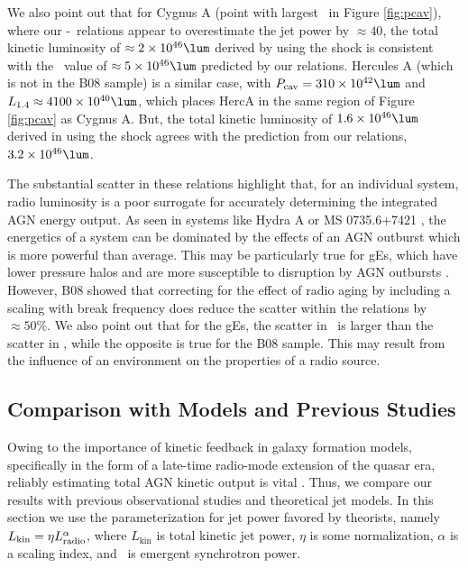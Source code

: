 \documentclass{emulateapj}
\begin{document}
We also point out that for Cygnus A (point with largest \prad\ in
Figure \ref{fig:pcav}), where our \pjet-\prad\ relations appear to
overestimate the jet power by $\approx 40$, the total kinetic
luminosity of $\approx 2\times10^{46} \lum$ derived by
\citep{2006ApJ...644L...9W} using the shock is consistent with the
\pjet\ value of $\approx 5\times10^{46} \lum$ predicted by our
relations. Hercules A (which is not in the B08 sample) is a similar
case, with $\pcav = 310\times10^{42} \lum$ and $\phigh \approx
4100\times10^{40} \lum$, which places HercA in the same region of
Figure \ref{fig:pcav} as Cygnus A. But, the total kinetic luminosity
of $1.6\times10^{46} \lum$ derived in \citet{herca} using the shock
agrees with the prediction from our relations, $3.2\times10^{46}
\lum$.

The substantial scatter in these relations highlight that, for an
individual system, radio luminosity is a poor surrogate for accurately
determining the integrated AGN energy output. As seen in systems like
Hydra A \citep{hydraa} or MS 0735.6+7421 \citep{ms0735}, the
energetics of a system can be dominated by the effects of an AGN
outburst which is more powerful than average. This may be particularly
true for gEs, which have lower pressure halos and are more susceptible
to disruption by AGN outbursts \citep{2006MNRAS.372.1161W,
  2008ApJ...687L..53P}. However, B08 showed that correcting for the
effect of radio aging by including a scaling with break frequency does
reduce the scatter within the relations by $\approx 50\%$. We also
point out that for the gEs, the scatter in \prad\ is larger than the
scatter in \pcav, while the opposite is true for the B08 sample. This
may result from the influence of an environment on the properties of a
radio source.

\subsection{Comparison with Models and Previous Studies}
\label{sec:models}

Owing to the importance of kinetic feedback in galaxy formation
models, specifically in the form of a late-time radio-mode extension
of the quasar era, reliably estimating total AGN kinetic output is
vital \citep{2007ApJ...658L...9H}. Thus, we compare our results with
previous observational studies and theoretical jet models. In this
section we use the parameterization for jet power favored by
theorists, namely $L_{\mathrm{kin}} = \eta L_{\mathrm{radio}}^{\alpha}$, where
$L_{\mathrm{kin}}$ is total kinetic jet power, $\eta$ is some
normalization, $\alpha$ is a scaling index, and \prad\ is emergent
synchrotron power.
\end{document}
